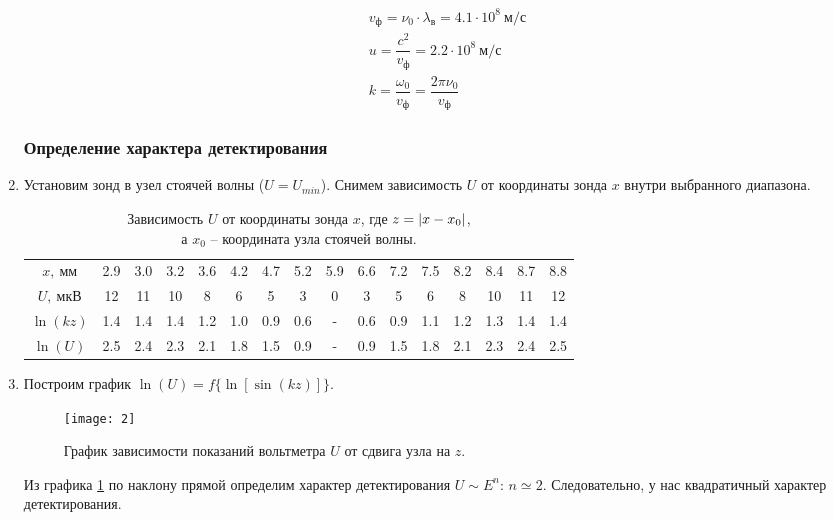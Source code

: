 \documentclass{lab}
\begin{document}
\begin{enumerate}
\begin{equation}
\begin{aligned}
&v_ф = \nu_0 \cdot \lambda_в = 4.1 \cdot 10^8~м/с\\
&u = \dfrac{c^2}{v_ф} = 2.2 \cdot 10^8~м/с\\
&k = \dfrac{\omega_0}{v_ф} = \dfrac{2\pi\nu_0}{v_ф}
\end{aligned}
\end{equation}

\subsubsection*{Определение характера детектирования}

\item Установим зонд в узел стоячей волны ($ U=U_{min} $). Снимем зависимость $ U $ от
координаты зонда $ x $ внутри выбранного диапазона.

\begin{table}[H]
	\centering
	\begin{tabular}{|c|ccccccccccccccc|}
		\hline
		$x,~мм$		&2.9&3.0&3.2&3.6&4.2&4.7&5.2&5.9&6.6&7.2&7.5&8.2&8.4&8.7&8.8\\ %
		$U,~мкВ$	&12&11&10&8&6&5&3&0&3&5&6&8&10&11&12\\ \hline \hline
		$\ln(kz)$	&1.4&1.4&1.4&1.2&1.0&0.9&0.6&-&0.6&0.9&1.1&1.2&1.3&1.4&1.4 \\
		$\ln(U)$	&2.5&2.4&2.3&2.1&1.8&1.5&0.9&-&0.9&1.5&1.8&2.1&2.3&2.4&2.5 \\ \hline
	\end{tabular}
	\caption{\footnotesize 
		Зависимость $ U $ от координаты зонда $ x $, где $ z=\left| x-x_0 \right| $,\\
		а $ x_0 $ -- координата узла стоячей волны.
	}
	\label{tab2}
\end{table}

\item Построим график $ \ln(U) = f\{\ln\left[\sin(kz)\right]\} $.

\begin{figure}[H]
	\centering
	\texttt{[image: 2]}
	\caption{\footnotesize
		График зависимости показаний вольтметра $ U $ от сдвига узла на $ z $.
	}
	\label{graph2}
\end{figure}

Из графика \ref{graph2} по наклону прямой определим характер детектирования $ U \sim E^n $:
$ n \simeq 2 $. Следовательно, у нас квадратичный характер детектирования.


\end{enumerate}
\end{document}
